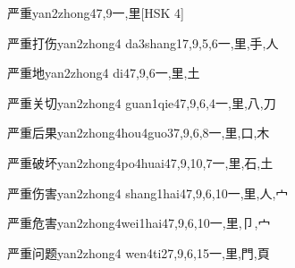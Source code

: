 \begin{EntryWithPhonetic}{严重}{yan2zhong4}{7,9}{⼀,⾥}[HSK 4]
\end{EntryWithPhonetic}

\begin{EntryWithPhonetic}{严重打伤}{yan2zhong4 da3shang1}{7,9,5,6}{⼀,⾥,⼿,⼈}
\end{EntryWithPhonetic}

\begin{EntryWithPhonetic}{严重地}{yan2zhong4 di4}{7,9,6}{⼀,⾥,⼟}
\end{EntryWithPhonetic}

\begin{EntryWithPhonetic}{严重关切}{yan2zhong4 guan1qie4}{7,9,6,4}{⼀,⾥,⼋,⼑}
\end{EntryWithPhonetic}

\begin{EntryWithPhonetic}{严重后果}{yan2zhong4hou4guo3}{7,9,6,8}{⼀,⾥,⼝,⽊}
\end{EntryWithPhonetic}

\begin{EntryWithPhonetic}{严重破坏}{yan2zhong4po4huai4}{7,9,10,7}{⼀,⾥,⽯,⼟}
\end{EntryWithPhonetic}

\begin{EntryWithPhonetic}{严重伤害}{yan2zhong4 shang1hai4}{7,9,6,10}{⼀,⾥,⼈,⼧}
\end{EntryWithPhonetic}

\begin{EntryWithPhonetic}{严重危害}{yan2zhong4wei1hai4}{7,9,6,10}{⼀,⾥,⼙,⼧}
\end{EntryWithPhonetic}

\begin{EntryWithPhonetic}{严重问题}{yan2zhong4 wen4ti2}{7,9,6,15}{⼀,⾥,⾨,⾴}
\end{EntryWithPhonetic}

